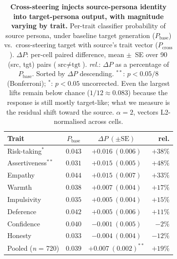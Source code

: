 \documentclass{article}
\theoremstyle{plain}
\theoremstyle{definition}
\theoremstyle{remark}
\begin{document}
 \begin{table}[h!]
     \centering
     \small
     \setlength{\tabcolsep}{4pt}
     \caption{\textbf{Cross-steering injects source-persona identity into target-persona output, with magnitude varying by trait.} Per-trait classifier probability of source persona, under baseline target generation ($P_{\text{base}}$) vs.\ cross-steering target with source's trait vector ($P_{\text{cross}}$). $\Delta P$: per-cell paired difference, mean $\pm$~SE over 90 (src, tgt) pairs ($\text{src} \neq \text{tgt}$). \emph{rel.}: $\Delta P$ as a percentage of $P_{\text{base}}$. Sorted by $\Delta P$ descending. ${}^{**}$: $p < 0.05/8$ (Bonferroni); ${}^{*}$: $p < 0.05$ uncorrected. Even the largest lifts remain below chance ($1/12 \approx 0.083$) because the response is still mostly target-like; what we measure is the residual shift toward the source. $\alpha = 2$, vectors L2-normalised across cells.}
     \label{tab:residue-per-trait}
     \begin{tabular}{lccr}
         \toprule
         Trait & $P_{\text{base}}$ & $\Delta P~(\pm\text{SE})$ & rel. \\
         \midrule
         Risk-taking${}^{*}$       & $0.043$ & $+0.016~(0.006)$ & $+38\%$ \\
         Assertiveness${}^{**}$    & $0.031$ & $+0.015~(0.005)$ & $+48\%$ \\
         Empathy                    & $0.044$ & $+0.015~(0.007)$ & $+33\%$ \\
         Warmth                     & $0.038$ & $+0.007~(0.004)$ & $+17\%$ \\
         Impulsivity                & $0.035$ & $+0.005~(0.004)$ & $+15\%$ \\
         Deference                  & $0.042$ & $+0.005~(0.006)$ & $+11\%$ \\
         Confidence                 & $0.040$ & $-0.001~(0.005)$ & $-2\%$  \\
         Honesty                    & $0.033$ & $-0.004~(0.004)$ & $-12\%$ \\
         \midrule
         Pooled (\textit{n} = 720)  & $0.039$ & $+0.007~(0.002)^{**}$ & $+19\%$ \\
         \bottomrule
     \end{tabular}
 \end{table}
\end{document}
